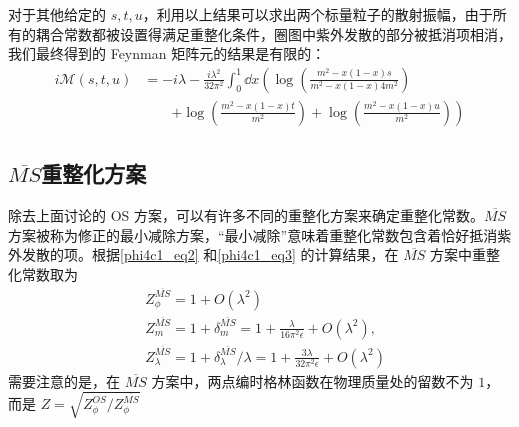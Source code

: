 对于其他给定的 $s,t,u$，利用以上结果可以求出两个标量粒子的散射振幅，由于所有的耦合常数都被设置得满足重整化条件，圈图中紫外发散的部分被抵消项相消，我们最终得到的 Feynman 矩阵元的结果是有限的：
\begin{equation}
\begin{aligned}
i\mathcal{M}(s,t,u)&=-i\lambda - \frac{i\lambda^2}{32\pi^2}\int_0^1 \dd x\left(\log\left(\frac{m^2-x(1-x)s}{m^2-x(1-x)4m^2}\right)\right.
\\
&\quad\quad\left.+
\log\left(\frac{m^2-x(1-x)t}{m^2}\right)
+
\log\left(\frac{m^2-x(1-x)u}{m^2}\right)
\right)
\end{aligned}
\end{equation}

\subsection{$\overline{MS}$重整化方案}

除去上面讨论的 OS 方案，可以有许多不同的重整化方案来确定重整化常数。$\overline{MS}$ 方案被称为修正的最小减除方案，“最小减除”意味着重整化常数包含着恰好抵消紫外发散的项。根据\autoref{phi4c1_eq2} 和\autoref{phi4c1_eq3} 的计算结果，在 $\overline{MS}$ 方案中重整化常数取为
\begin{equation}
\begin{aligned}
&Z^{\overline{MS}}_{\phi}=1+O(\lambda^2)\\
&Z^{\overline{MS}}_{m}=1+\delta^{\overline{MS}}_m = 1+\frac{\lambda}{16\pi^2\epsilon}+O(\lambda^2),\\
&Z^{\overline{MS}}_{\lambda} = 1+\delta_\lambda^{\overline{MS}}/\lambda = 1+\frac{3\lambda}{32\pi^2\epsilon}+O(\lambda^2)
\end{aligned}
\end{equation}
需要注意的是，在 $\overline{MS}$ 方案中，两点编时格林函数在物理质量处的留数不为 $1$，而是 $Z=\sqrt{Z^{OS}_\phi/Z^{\overline{MS}}_\phi}$